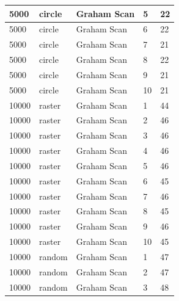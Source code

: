\documentclass[12pt]{article}
\begin{document}
\begin{longtable}{|l|l|l|l|l|}
5000         & circle            & Graham Scan & 5          & 22                            \\ \hline
5000         & circle            & Graham Scan & 6          & 22                            \\ \hline
5000         & circle            & Graham Scan & 7          & 21                            \\ \hline
5000         & circle            & Graham Scan & 8          & 22                            \\ \hline
5000         & circle            & Graham Scan & 9          & 21                            \\ \hline
5000         & circle            & Graham Scan & 10         & 21                            \\ \hline
10000        & raster            & Graham Scan & 1          & 44                            \\ \hline
10000        & raster            & Graham Scan & 2          & 46                            \\ \hline
10000        & raster            & Graham Scan & 3          & 46                            \\ \hline
10000        & raster            & Graham Scan & 4          & 46                            \\ \hline
10000        & raster            & Graham Scan & 5          & 46                            \\ \hline
10000        & raster            & Graham Scan & 6          & 45                            \\ \hline
10000        & raster            & Graham Scan & 7          & 46                            \\ \hline
10000        & raster            & Graham Scan & 8          & 45                            \\ \hline
10000        & raster            & Graham Scan & 9          & 46                            \\ \hline
10000        & raster            & Graham Scan & 10         & 45                            \\ \hline
10000        & random            & Graham Scan & 1          & 47                            \\ \hline
10000        & random            & Graham Scan & 2          & 47                            \\ \hline
10000        & random            & Graham Scan & 3          & 48                            \\ \hline

\end{longtable}
\end{document}
